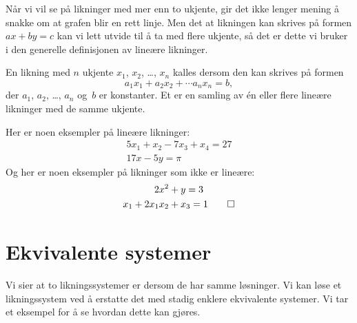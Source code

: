 Når vi vil se på likninger med mer enn to ukjente, gir det ikke lenger
mening å snakke om at grafen blir en rett linje.  Men det at likningen
kan skrives på formen $ax + by = c$ kan vi lett utvide til å ta med
flere ukjente, så det er dette vi bruker i den generelle definisjonen
av lineære likninger.

\begin{defn}
En likning med $n$ ukjente $x_1$, $x_2$, \ldots, $x_n$ kalles
 dersom den kan skrives på formen
\[
a_1 x_1 + a_2 x_2 + \cdots a_n x_n = b,
\]
der $a_1$, $a_2$, \ldots, $a_n$ og~$b$ er konstanter.  Et
 er en samling av én eller flere
lineære likninger med de samme ukjente.
\end{defn}


\begin{ex}
Her er noen eksempler på lineære likninger:
\begin{gather*}
5 x_1 + x_2 - 7 x_3 + x_4 = 27 \\
17 x - 5y = \pi
\end{gather*}
Og her er noen eksempler på likninger som ikke er lineære:
\begin{gather*}
2 x^2 + y = 3 \\
x_1 + 2 x_1 x_2 + x_3 = 1
\qedhere
\end{gather*}
\end{ex}


\section*{Ekvivalente systemer}

Vi sier at to likningssystemer er
\label{def:ekvivalente} dersom de har samme
løsninger.  Vi kan løse et likningssystem ved å erstatte det med
stadig enklere ekvivalente systemer.  Vi tar et eksempel for å se
hvordan dette kan gjøres.

